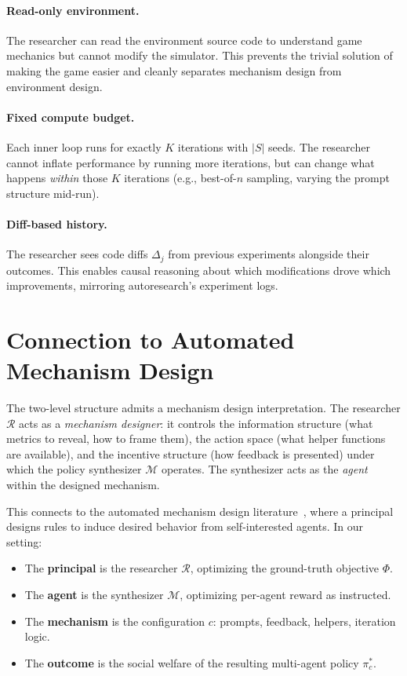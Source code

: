 \documentclass[sigconf,authordraft]{acmart}
\newcommand{\cR}{\mathcal{R}}
\newcommand{\cM}{\mathcal{M}}
\begin{document}
\paragraph{Read-only environment.}
The researcher can read the environment source code to understand game mechanics but cannot modify the simulator. This prevents the trivial solution of making the game easier and cleanly separates mechanism design from environment design.

\paragraph{Fixed compute budget.}
Each inner loop runs for exactly $K$ iterations with $|S|$ seeds. The researcher cannot inflate performance by running more iterations, but can change what happens \emph{within} those $K$ iterations (e.g., best-of-$n$ sampling, varying the prompt structure mid-run).

\paragraph{Diff-based history.}
The researcher sees code diffs $\Delta_j$ from previous experiments alongside their outcomes. This enables causal reasoning about which modifications drove which improvements, mirroring autoresearch's experiment logs.

\section{Connection to Automated Mechanism Design}

The two-level structure admits a mechanism design interpretation. The researcher $\cR$ acts as a \emph{mechanism designer}: it controls the information structure (what metrics to reveal, how to frame them), the action space (what helper functions are available), and the incentive structure (how feedback is presented) under which the policy synthesizer $\cM$ operates. The synthesizer acts as the \emph{agent} within the designed mechanism.

This connects to the automated mechanism design literature~\cite{conitzer2002}, where a principal designs rules to induce desired behavior from self-interested agents. In our setting:
\begin{itemize}
  \item The \textbf{principal} is the researcher $\cR$, optimizing the ground-truth objective $\Phi$.
  \item The \textbf{agent} is the synthesizer $\cM$, optimizing per-agent reward as instructed.
  \item The \textbf{mechanism} is the configuration $c$: prompts, feedback, helpers, iteration logic.
  \item The \textbf{outcome} is the social welfare of the resulting multi-agent policy $\pi^*_c$.
\end{itemize}
\end{document}
